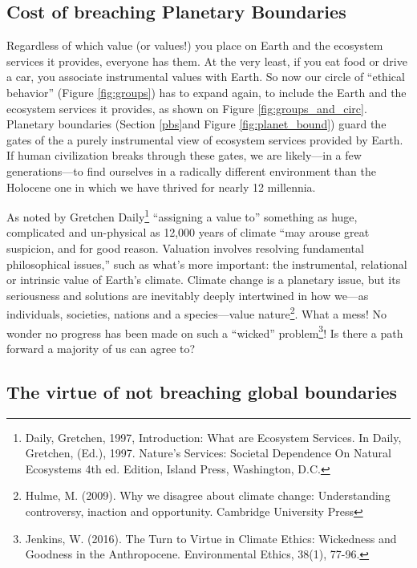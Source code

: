 \subsection{Cost of breaching Planetary Boundaries}\label{breach}
Regardless of which value (or values!) you place on Earth and the ecosystem services it provides, everyone has them. At the very least, if you eat food or drive a car, you associate instrumental values with Earth. So now our circle of ``ethical behavior'' (Figure \ref{fig:groups}) has to expand again, to include the Earth and the ecosystem services it provides, as shown on Figure \ref{fig:groups_and_circ}. Planetary boundaries (Section \ref{pbs}and Figure \ref{fig:planet_bound}) guard the gates of the a purely instrumental view of ecosystem services provided by Earth. If human civilization breaks through these gates, we are likely---in a few generations---to find ourselves in a radically different environment than the Holocene one in which we have thrived for nearly 12 millennia. 

As noted by Gretchen Daily\footnote{Daily, Gretchen, 1997, Introduction: What are Ecosystem Services. In Daily, Gretchen, (Ed.), 1997. Nature's Services: Societal Dependence On Natural Ecosystems 4th ed. Edition, Island Press, Washington, D.C.} ``assigning a value to'' something as huge, complicated and un-physical as 12,000 years of climate ``may arouse great suspicion, and for good reason. Valuation involves resolving fundamental philosophical issues,'' such as what's more important: the instrumental, relational or intrinsic value of Earth's climate. Climate change is a planetary issue, but its seriousness and solutions are inevitably deeply intertwined in how we---as individuals, societies, nations and a species---value nature\footnote{Hulme, M. (2009). Why we disagree about climate change: Understanding controversy, inaction and opportunity. Cambridge University Press}. What a mess! No wonder no progress has been made on such a ``wicked'' problem\footnote{Jenkins, W. (2016). The Turn to Virtue in Climate Ethics: Wickedness and Goodness in the Anthropocene. Environmental Ethics, 38(1), 77-96.}! Is there a path forward a majority of us can agree to?

\subsection{The virtue of not breaching global boundaries}
